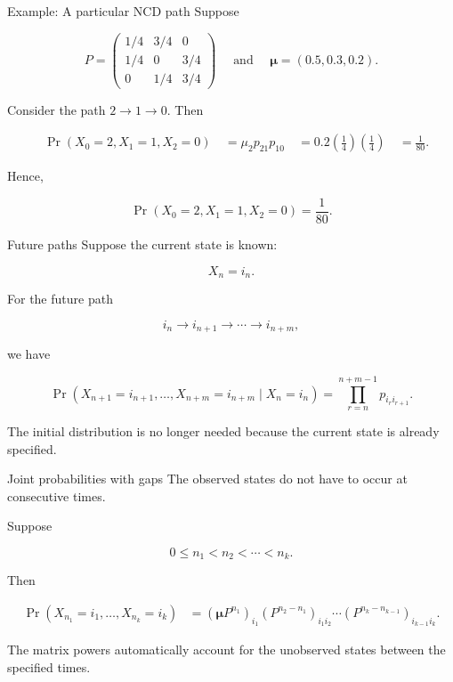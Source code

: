 \documentclass[
  ignorenonframetext,
  aspectratio=169,
]{beamer}
\begin{document}
\begin{frame}{Example: A particular NCD path}
\protect{}\label{example-a-particular-ncd-path}
Suppose

\[
P=
\begin{pmatrix}
1/4&3/4&0\\
1/4&0&3/4\\
0&1/4&3/4
\end{pmatrix} \quad \text{ and } \quad \boldsymbol{\mu}=(0.5,0.3,0.2).
\]

Consider the path \(2\longrightarrow1\longrightarrow0.\) Then

\[
\begin{aligned}
&\Pr(X_0=2,X_1=1,X_2=0)\
&=
\mu_2p_{21}p_{10}\
&=
0.2\left(\frac14\right)\left(\frac14\right)\
&=
\frac1{80}.
\end{aligned}
\]

Hence,

\[
\boxed{
\Pr(X_0=2,X_1=1,X_2=0)=\frac1{80}.
}
\]
\end{frame}

\begin{frame}{Future paths}
\protect{}\label{future-paths}
Suppose the current state is known:

\[
X_n=i_n.
\]

For the future path

\[
i_n\longrightarrow i_{n+1}
\longrightarrow\cdots
\longrightarrow i_{n+m},
\]

we have

\[
\boxed{
\Pr(
X_{n+1}=i_{n+1},\ldots,X_{n+m}=i_{n+m}
\mid X_n=i_n)
=\prod_{r=n}^{n+m-1}
p_{i_ri_{r+1}}.
}
\]

The initial distribution is no longer needed because the current state
is already specified.
\end{frame}

\begin{frame}{Joint probabilities with gaps}
\protect\phantomsection\label{joint-probabilities-with-gaps}
The observed states do not have to occur at consecutive times.

Suppose

\[
0\leq n_1<n_2<\cdots<n_k.
\]

Then

\[
\boxed{
\begin{aligned}
\Pr(X_{n_1}=i_1,\ldots,X_{n_k}=i_k)
&=
(\boldsymbol{\mu}P^{n_1})_{i_1}
(P^{n_2-n_1})_{i_1i_2}
\cdots
(P^{n_k-n_{k-1}})_{i_{k-1}i_k}.
\end{aligned}
}
\]

The matrix powers automatically account for the unobserved states
between the specified times.
\end{frame}
\end{document}
